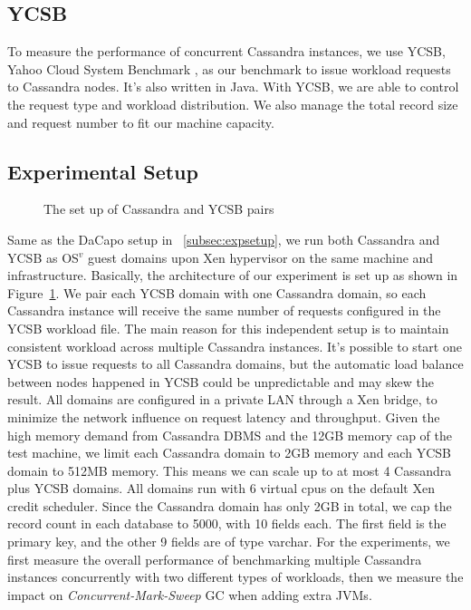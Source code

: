 \documentclass{sig-alternate}
\begin{document}
\subsection{YCSB}
To measure the performance of concurrent Cassandra instances, we use YCSB, Yahoo Cloud System Benchmark \cite{cooper2010benchmarking}, as our benchmark to issue workload requests to Cassandra nodes. It's also written in Java. With YCSB, we are able to control the request type and workload distribution. We also manage the total record size and request number to fit our machine capacity.

\subsection{Experimental Setup}
\begin{figure}
\centering
{}
\caption{The set up of Cassandra and YCSB pairs}
\label{fig:cassandrasetup}
\end{figure}
Same as the DaCapo setup in ~\ref{subsec:expsetup}, we run both Cassandra and YCSB as OS$^{v}$ guest domains upon Xen hypervisor on the same machine and infrastructure. Basically, the architecture of our experiment is set up as shown in Figure~\ref{fig:cassandrasetup}. We pair each YCSB domain with one Cassandra domain, so each Cassandra instance will receive the same number of requests configured in the YCSB workload file. The main reason for this independent setup is to maintain consistent workload across multiple Cassandra instances. It's possible to start one YCSB to issue requests to all Cassandra domains, but the automatic load balance between nodes happened in YCSB could be unpredictable and may skew the result. All domains are configured in a private LAN through a Xen bridge, to minimize the network influence on request latency and throughput. Given the high memory demand from Cassandra DBMS and the 12GB memory cap of the test machine, we limit each Cassandra domain to 2GB memory and each YCSB domain to 512MB memory. This means we can scale up to at most 4 Cassandra plus YCSB domains. All domains run with 6 virtual cpus on the default Xen credit scheduler. Since the Cassandra domain has only 2GB in total, we cap the record count in each database to 5000, with 10 fields each. The first field is the primary key, and the other 9 fields are of type varchar. For the experiments, we first measure the overall performance of benchmarking multiple Cassandra instances concurrently with two different types of workloads, then we measure the impact on \textit{Concurrent-Mark-Sweep} GC when adding extra JVMs.
\end{document}
